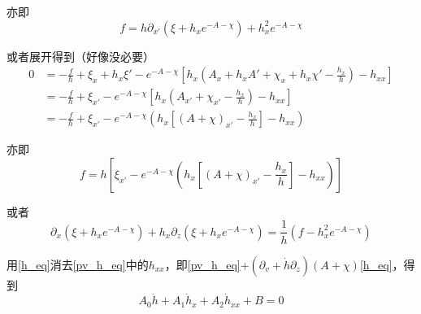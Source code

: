 \documentclass[12pt,a4paper]{ctexart}
\numberwithin{equation}{section}
\begin{document}
亦即
\begin{equation}
    f=h\partial_{x'}(\xi+h_{x}e^{-A-\chi})+h_{x}^{2}e^{-A-\chi}
\end{equation}


或者展开得到（好像没必要）
\begin{equation}
    \begin{aligned}
        0&=-\frac{f}{h}+\xi_x+h_x\xi'-e^{-A-\chi}[h_x(A_x+h_x A'+\chi_x+h_x\chi'-\frac{h_x}{h})-h_{xx}]\\
        &=-\frac{f}{h}+\xi_{x'}-e^{-A-\chi}[h_x(A_{x'}+\chi_{x'}-\frac{h_x}{h})-h_{xx}]\\
        &=-\frac{f}{h}+\xi_{x'}-e^{-A-\chi}(h_x[(A+\chi)_{x'}-\frac{h_x}{h}]-h_{xx})
    \end{aligned}
\end{equation}

亦即
\begin{equation}
    f=h[\xi_{x'}-e^{-A-\chi}(h_x[(A+\chi)_{x'}-\frac{h_x}{h}]-h_{xx})]
\end{equation}

或者
\begin{equation}
    \partial_{x}(\xi+h_{x}e^{-A-\chi})+h_{x}\partial_{z}(\xi+h_{x}e^{-A-\chi})=\frac{1}{h}(f-h_{x}^{2}e^{-A-\chi})
\end{equation}

用\eqref{h_eq}消去\eqref{pv_h_eq}中的$h_{xx}$，即\eqref{pv_h_eq}+$(\partial_v+\dot{h}\partial_z)(A+\chi)$\eqref{h_eq}，得到
\begin{equation}
    A_0\dot{h}+A_1\dot{h}_x+A_2\dot{h}_{xx}+B=0
\end{equation}
\end{document}
